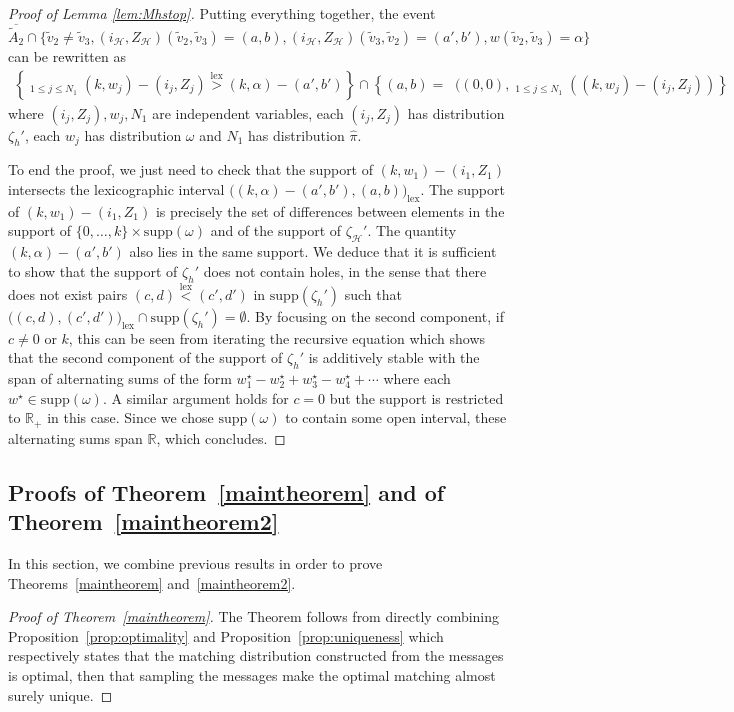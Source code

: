 \documentclass[11pt]{article}
\DeclareMathOperator{\lex}{lex}
\DeclareMathOperator*{\maxlex}{\overset{\lex}{\max}}
\DeclareMathOperator*{\maxxlex}{\overset{[2],\lex}{\max}}
\begin{document}
\begin{proof}[Proof of Lemma \ref{lem:Mhstop}]
Putting everything together, the event \[\overline{\tilde{A}_2} \cap  \big\{\tilde{v}_2\neq \tilde{v}_3, (i_{\mathcal{H}},Z_{\mathcal{H}})(\tilde{v}_{2},\tilde{v}_{3})=(a,b),(i_{\mathcal{H}},Z_{\mathcal{H}})(\tilde{v}_{3},\tilde{v}_{2})=(a',b'),w(\tilde{v}_{2},\tilde{v}_{3})=\alpha \bigg\}  \]  can be rewritten as
\begin{align*}
\left\{ \maxxlex_{1 \leq j \leq N_1} (k, w_j)-(i_j,Z_j) \overset{\lex}{>} (k,\alpha)-(a',b') \right\} \cap
\left\{ (a,b)= \maxlex( (0,0), \maxlex_{1\leq j \leq N_1}\left( (k,w_j)-(i_j,Z_j) \right)
\right\}
\end{align*}
where $(i_j,Z_j),w_j,N_1$ are independent variables, each $(i_j,Z_j)$ has distribution $\zeta_h'$, each $w_j$ has distribution $\omega$ and $N_1$ has distribution $\hat{\pi}$.

To end the proof, we just need to check that the support of $(k,w_1)-(i_1, Z_1)$ intersects the lexicographic interval $\bigg((k,\alpha)-(a',b'),(a,b) \bigg)_{\lex}$. The support of $(k,w_1)-(i_1,Z_1)$ is precisely the set of differences between elements in the support of $\{0,\dots,k\} \times \mathrm{supp}(\omega)$ and of the support of $\zeta_{\mathcal{H}}'$. The quantity $(k,\alpha)-(a',b')$ also lies in the same support. We deduce that it is sufficient to show that the support of $\zeta_h'$ does not contain holes, in the sense that there does not exist pairs $(c,d)\overset{\lex}{<}(c',d')$ in $\mathrm{supp}(\zeta_h')$ such that $\bigg( (c,d),(c',d')\bigg)_{\lex} \cap \mathrm{supp}(\zeta_h') = \emptyset$. By focusing on the second component, if $c\neq 0$ or $k$, this can be seen from iterating the recursive equation which shows that the second component of the support of $\zeta_h'$ is additively stable with the span of alternating sums of the form $w^{\star}_1-w_2^{\star}+w_3^{\star}-w_4^{\star} + \cdots$ where each $w^{\star} \in \mathrm{supp}(\omega)$. A similar argument holds for $c=0$ but the support is restricted to $\mathbb{R}_+$ in this case. Since we chose $\mathrm{supp}(\omega)$ to contain some open interval, these alternating sums span $\mathbb{R}$, which concludes.
\end{proof}

\subsection{Proofs of Theorem~\ref{maintheorem} and of Theorem~\ref{maintheorem2}}\label{sec:mainresults}


In this section, we combine previous results in order to prove Theorems~\ref{maintheorem} and~\ref{maintheorem2}.
\begin{proof}[Proof of Theorem~\ref{maintheorem}]
The Theorem follows from directly combining Proposition~\ref{prop:optimality} and Proposition~\ref{prop:uniqueness} which respectively states that the matching distribution constructed from the messages is optimal, then that sampling the messages make the optimal matching almost surely unique.
\end{proof}
\end{document}
